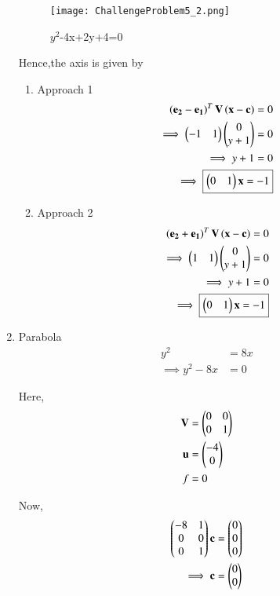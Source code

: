 \documentclass[journal,12pt,twocolumn]{IEEEtran}
\begin{document}
\begin{enumerate}
    \begin{figure}[!ht]
    \centering
    \texttt{[image: ChallengeProblem5\_2.png]}
    \caption{$y^2$-4x+2y+4=0}
    \label{ex2}	
    \end{figure}
    
    Hence,the axis is given by
    \begin{enumerate}
    \item Approach 1
    \begin{align}
    \left(\mathbf{e_2} - \mathbf{e_1}\right)^T\mathbf{V}\left(\mathbf{x}-\mathbf{c}\right) = 0\\
    \implies \begin{pmatrix}-1 & 1\end{pmatrix}\begin{pmatrix}0 \\ y+1\end{pmatrix} = 0 \\
    \implies y+1 = 0 \\
    \implies \boxed{\begin{pmatrix}0 & 1\end{pmatrix}\mathbf{x} = -1}
    \end{align}
    
    \item Approach 2
    \begin{align}
    \left(\mathbf{e_2} + \mathbf{e_1}\right)^T\mathbf{V}\left(\mathbf{x}-\mathbf{c}\right) = 0\\
    \implies \begin{pmatrix}1 & 1\end{pmatrix}\begin{pmatrix}0 \\ y+1\end{pmatrix} = 0 \\
    \implies y+1 = 0 \\
    \implies \boxed{\begin{pmatrix}0 & 1\end{pmatrix}\mathbf{x} = -1}
    \end{align}
    \end{enumerate}
    
    \item Parabola
    \begin{align}
        y^2 &= 8x
        \\
        \implies y^2-8x &= 0
    \end{align}
    
    Here,
    \begin{align}
    \mathbf{V} &= \begin{pmatrix}0 & 0 \\ 0 & 1\end{pmatrix} \\
    \mathbf{u} &= \begin{pmatrix}-4 \\ 0\end{pmatrix} \\
    f &= 0
    \end{align}

    Now,
    \begin{align}
    \begin{pmatrix}-8 & 1 \\ 0 & 0 \\ 0 & 1\end{pmatrix}\mathbf{c} &= \begin{pmatrix}0 \\ 0 \\ 0\end{pmatrix}
    \\
    \implies \mathbf{c} &= \begin{pmatrix}0 \\ 0\end{pmatrix}
    \end{align}
    

\end{enumerate}
\end{document}

